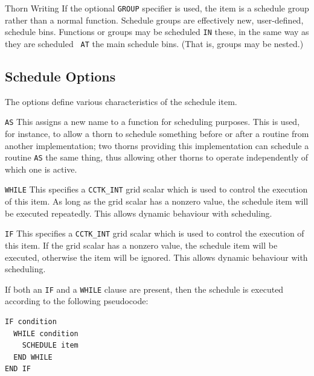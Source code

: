 \begin{cactuspart}{Thorn Writing}
If the optional \texttt{GROUP} specifier is used, the item is a schedule
group rather than a normal function.  Schedule groups are effectively
new, user-defined, schedule bins.  Functions or groups may be
scheduled \texttt{IN} these, in the same way as they are scheduled {\tt
AT} the main schedule bins.  (That is, groups may be nested.)


\subsection{Schedule Options}
\label{scheduling:schedule_options}
The options define various characteristics of the schedule item.

\begin{Lentry}
\item[\texttt{AS}]
This assigns a new name to a function for scheduling purposes.  This
is used, for instance, to allow a thorn to schedule something before
or after a routine from another implementation;  two thorns providing this
implementation can schedule a routine \texttt{AS} the same thing, thus
allowing other thorns to operate independently of which one is active.

\item[\texttt{WHILE}]
This specifies a \texttt{CCTK\_INT} grid scalar which is used to
control the execution of this item.  As long as the grid scalar has
a nonzero value, the schedule item will be executed repeatedly.  This
allows dynamic behaviour with scheduling.

\item[\texttt{IF}]
This specifies a \texttt{CCTK\_INT} grid scalar which is used to
control the execution of this item.  If the grid scalar has a
nonzero value, the schedule item will be executed, otherwise the item
will be ignored.  This allows dynamic behaviour with scheduling.

If both an \texttt{IF} and a \texttt{WHILE} clause are present, then
the schedule is executed according to the following pseudocode:
\begin{verbatim}
IF condition
  WHILE condition
    SCHEDULE item
  END WHILE
END IF
\end{verbatim}


\end{Lentry}
\end{cactuspart}
